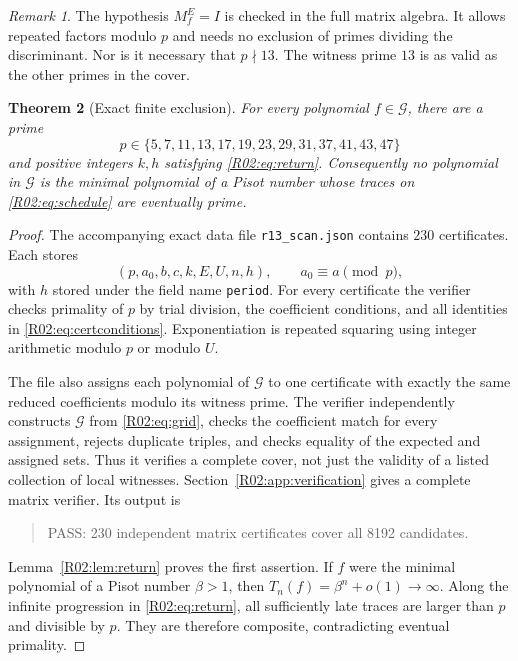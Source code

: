 \documentclass[11pt,a4paper]{article}
\newtheorem{theorem}{Theorem}[section]
\theoremstyle{definition}\newtheorem{definition}[theorem]{Definition}
\theoremstyle{remark}\newtheorem{remark}[theorem]{Remark}
\begin{document}
\begin{remark}
The hypothesis $M_f^E=I$ is checked in the full matrix algebra. It
allows repeated factors modulo $p$ and needs no exclusion of primes
dividing the discriminant. Nor is it necessary that $p\nmid13$.
The witness prime $13$ is as valid as the other primes in the cover.
\end{remark}

\begin{theorem}[Exact finite exclusion]\label{R02:thm:finite}
For every polynomial $f\in\mathcal G$, there are a prime
\[
 p\in\{5,7,11,13,17,19,23,29,31,37,41,43,47\}
\]
and positive integers $k,h$ satisfying \eqref{R02:eq:return}.
Consequently no polynomial in $\mathcal G$ is the minimal polynomial
of a Pisot number whose traces on \eqref{R02:eq:schedule} are eventually
prime.
\end{theorem}
\begin{proof}
The accompanying exact data file \texttt{r13\_scan.json} contains
$230$ certificates. Each stores
\[
 (p,a_0,b,c,k,E,U,n,h),\qquad a_0\equiv a\pmod p,
\]
with $h$ stored under the field name \texttt{period}.
For every certificate the verifier checks primality of $p$ by trial
division, the coefficient conditions, and all identities in
\eqref{R02:eq:certconditions}. Exponentiation is repeated squaring using
integer arithmetic modulo $p$ or modulo $U$.

The file also assigns each polynomial of $\mathcal G$ to one
certificate with exactly the same reduced coefficients modulo its
witness prime. The verifier independently constructs $\mathcal G$
from \eqref{R02:eq:grid}, checks the coefficient match for every
assignment, rejects duplicate triples, and checks equality of the
expected and assigned sets. Thus it verifies a complete cover,
not just the validity of a listed collection of local witnesses.
Section~\ref{R02:app:verification} gives a complete matrix verifier.
Its output is
\begin{quote}\ttfamily
PASS: 230 independent matrix certificates cover all 8192 candidates.
\end{quote}
Lemma~\ref{R02:lem:return} proves the first assertion.
If $f$ were the minimal polynomial of a Pisot number $\beta>1$,
then $T_n(f)=\beta^n+o(1)\to\infty$. Along the infinite progression
in \eqref{R02:eq:return}, all sufficiently late traces are larger than
$p$ and divisible by $p$. They are therefore composite, contradicting
eventual primality.
\end{proof}
\end{document}
